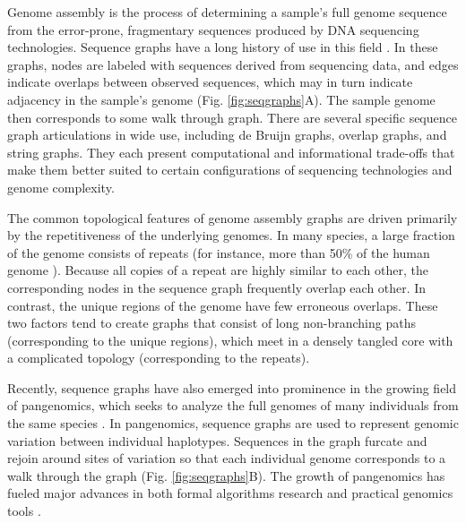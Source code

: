 \documentclass[11pt]{ucthesis}
\newcommand{\figref}[1]{Fig. \ref{fig:#1}}
\begin{document}
Genome assembly is the process of determining a sample's full genome sequence from the error-prone, fragmentary sequences produced by DNA sequencing technologies.
Sequence graphs have a long history of use in this field \cite{myers1995toward,pevzner2001eulerian,myers2005fragment}.
In these graphs, nodes are labeled with sequences derived from sequencing data, and edges indicate overlaps between observed sequences, which may in turn indicate adjacency in the sample's genome (\figref{seqgraphs}A).
The sample genome then corresponds to some walk through graph.
There are several specific sequence graph articulations in wide use, including de Bruijn graphs, overlap graphs, and string graphs.
They each present computational and informational trade-offs that make them better suited to certain configurations of sequencing technologies and genome complexity.

The common topological features of genome assembly graphs are driven primarily by the repetitiveness of the underlying genomes.
In many species, a large fraction of the genome consists of repeats (for instance, more than 50\% of the human genome \cite{haubold2006repetitive}).
Because all copies of a repeat are highly similar to each other, the corresponding nodes in the sequence graph frequently overlap each other.
In contrast, the unique regions of the genome have few erroneous overlaps.
These two factors tend to create graphs that consist of long non-branching paths (corresponding to the unique regions), which meet in a densely tangled core with a complicated topology (corresponding to the repeats).

Recently, sequence graphs have also emerged into prominence in the growing field of pangenomics, which seeks to analyze the full genomes of many individuals from the same species \cite{computational2018computational}.
In pangenomics, sequence graphs are used to represent genomic variation between individual haplotypes.
Sequences in the graph furcate and rejoin around sites of variation so that each individual genome corresponds to a walk through the graph (\figref{seqgraphs}B).
The growth of pangenomics has fueled major advances in both formal algorithms research \cite{rautiainen2017aligning,jain2019on} and practical genomics tools \cite{garrison2018variation,rautiainen2020graphaligner}.
\end{document}
